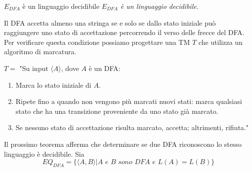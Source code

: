 \begin{Thm}{$E_{DFA}$ è un linguaggio decidibile}{}\label{thm:edfa-decidibile}
\textit{$E_{DFA}$ è un linguaggio decidibile.}

\begin{demonstration}
Il DFA accetta almeno una stringa se e solo se dallo stato iniziale può raggiungere uno stato di accettazione percorrendo il verso delle frecce del DFA. Per verificare questa condizione possiamo progettare una TM $T$ che utilizza un algoritmo di marcatura.

$T =$ "Su input $\langle A\rangle$, dove $A$ è un DFA:    
\begin{enumerate}
    \item Marca lo stato iniziale di $A$.
    \item Ripete fino a quando non vengono più marcati nuovi stati: marca qualsiasi stato che ha una transizione proveniente da uno stato già marcato.
    \item Se nessuno stato di accettazione risulta marcato, accetta; altrimenti, rifiuta."    
\end{enumerate}
\end{demonstration}
\end{Thm}

Il prossimo teorema afferma che determinare se due DFA riconoscono lo stesso linguaggio è decidibile. Sia
\begin{equation*}
EQ_{DFA} =\{\langle A,B \rangle | A\textit{ e }B\textit{ sono DFA e }L(A) = L(B)\}    
\end{equation*}

